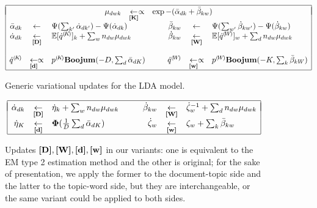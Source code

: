 \begin{figure*}
\[
\begin{array}{|rcl@{\hspace{1cm}}rcl|}
\hline
&&&&& \\[-.35cm]
\multicolumn{6}{|c|}{
\begin{array}{rcl}
\vvmDWK_{dwk} & \assign{K}\propto & \exp-(\vvmbDK_{dk}+\vvmbKW_{kw})
\end{array}
} \\
\vvmbDK_{dk} & \assignn & \Psi(\sum_{k'}\vvmDK_{dk'})-\Psi(\vvmDK_{dk}) &
\vvmbKW_{kw} & \assignn & \Psi(\sum_{w'}\vvmKW_{kw'})-\Psi(\vvmKW_{kw})\\
\vvmDK_{dk} & \assign{D} & \expectation[\cpnt{\dot{q}}{K}]_k+\sum_wn_{dw}\vvmDWK_{dwk} &
\vvmKW_{kw} & \assign{W} & \expectation[\cpnt{\dot{q}}{W}]_w+\sum_dn_{dw}\vvmDWK_{dwk} \\
&&&&& \\
\cpnt{\dot{q}}{K} & \assign{d}\propto & \cpnt{p}{K}\mbeta(-D,\sum_d\vvmbDK_{dK}) &
\cpnt{\dot{q}}{W} & \assign{w}\propto & \cpnt{p}{W}\mbeta(-K,\sum_k\vvmbKW_{kW})\\
\hline
\end{array}
\]
\caption{\label{fig:ldaupdates}Generic variational updates for the LDA model.}
\[
\begin{array}{|rcl@{\hspace{1cm}}rcl|}
\hline
&&&&& \\[-.35cm]
\vvmDK_{dk} & \assign{D} & \vvmK_k +\sum_wn_{dw}\vvmDWK_{dwk} &
\vvmKW_{kw} & \assign{W} & \vvmW_w^{-1}+\sum_dn_{dw}\vvmDWK_{dwk} \\
\vvmK_K & \assign{d} & \boldsymbol{\Phi}(\frac{1}{D}\sum_d\vvmbDK_{dK}) &
\vvmW_w & \assign{w} & \pmW_w+\sum_k\vvmbKW_{kw} \\
\hline
\end{array}
\]
\caption{\label{fig:ldaupdates-variant}Updates $\textbf{[D]},\textbf{[W]},\textbf{[d]},\textbf{[w]}$ in our variants: one is equivalent to the EM type 2 estimation method and the other is original; for the sake of presentation, we apply the former to the document-topic side and the latter to the topic-word side, but they are interchangeable, or the same variant could be applied to both sides.}
\end{figure*}
